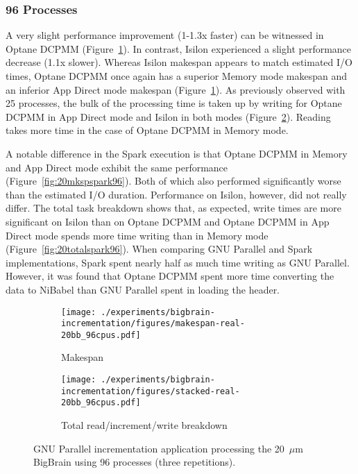 \documentclass[conference]{IEEEtran}
\begin{document}
\subsubsection{96 Processes}

A very slight performance improvement (1-1.3x faster) can be witnessed in Optane DCPMM (Figure~\ref{fig:20mksp96}). In 
contrast, Isilon 
experienced a slight performance decrease (1.1x slower). Whereas Isilon makespan appears to match
estimated I/O times, Optane DCPMM once again has a superior Memory mode makespan and an inferior App Direct
mode makespan (Figure~\ref{fig:20mksp96}). As previously observed with 25 processes,
the bulk of the processing time is taken up by writing for Optane DCPMM in App Direct mode and 
Isilon in both modes (Figure~\ref{fig:20total96}). Reading takes more time in the case of Optane DCPMM 
in Memory mode. 


A notable difference in the Spark execution is that Optane DCPMM in Memory and App Direct mode
exhibit the same performance (Figure~\ref{fig:20mkspspark96}). Both of which also performed
significantly worse than the estimated I/O duration. Performance on Isilon, however, did
not really differ. The total task breakdown shows that, as expected, write times are more
significant on Isilon than on Optane DCPMM and Optane DCPMM in App Direct mode spends more time writing
than in Memory mode (Figure~\ref{fig:20totalspark96}). When comparing GNU Parallel and 
Spark implementations, Spark spent nearly half as much time writing as GNU Parallel. However,
it was found that Optane DCPMM spent more time converting the data to NiBabel than GNU Parallel spent
in loading the header.

\begin{figure*}
    \begin{subfigure}{\columnwidth}
        \centering
    \texttt{[image: ./experiments/bigbrain-incrementation/figures/makespan-real-20bb\_96cpus.pdf]}
    \caption{Makespan}\label{fig:20mksp96}
\end{subfigure}
\begin{subfigure}{\columnwidth}
        \centering
    \texttt{[image: ./experiments/bigbrain-incrementation/figures/stacked-real-20bb\_96cpus.pdf]}
    \caption{Total read/increment/write breakdown}\label{fig:20total96}
\end{subfigure}
\caption{GNU Parallel incrementation application processing the 20~$\mu$m BigBrain using
96 processes (three repetitions).}\label{fig:2096}
\captionsetup{belowskip=-10pt}
\end{figure*}
\end{document}
